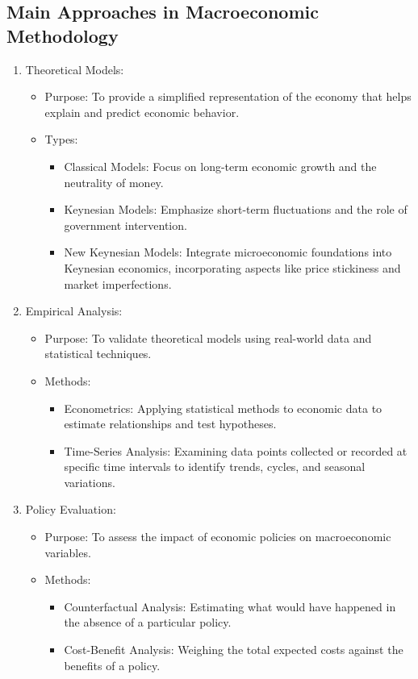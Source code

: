 \documentclass[10pt]{article}
\begin{document}
\subsection*{Main Approaches in Macroeconomic Methodology}
\begin{enumerate}
  \item Theoretical Models:

    \begin{itemize}
      \item Purpose: To provide a simplified representation of the economy that helps explain and predict economic behavior.
      \item Types:
      \begin{itemize}
        \item Classical Models: Focus on long-term economic growth and the neutrality of money.
        \item Keynesian Models: Emphasize short-term fluctuations and the role of government intervention.
        \item New Keynesian Models: Integrate microeconomic foundations into Keynesian economics, incorporating aspects like price stickiness and market imperfections.
      \end{itemize}
    \end{itemize}

  \item Empirical Analysis:

    \begin{itemize}
      \item Purpose: To validate theoretical models using real-world data and statistical techniques.
      \item Methods:
      \begin{itemize}
        \item Econometrics: Applying statistical methods to economic data to estimate relationships and test hypotheses.
        \item Time-Series Analysis: Examining data points collected or recorded at specific time intervals to identify trends, cycles, and seasonal variations.
      \end{itemize}
    \end{itemize}

  \item Policy Evaluation:

    \begin{itemize}
      \item Purpose: To assess the impact of economic policies on macroeconomic variables.
      \item Methods:
      \begin{itemize}
        \item Counterfactual Analysis: Estimating what would have happened in the absence of a particular policy.
        \item Cost-Benefit Analysis: Weighing the total expected costs against the benefits of a policy.
      \end{itemize}
    \end{itemize}

\end{enumerate}
\end{document}
